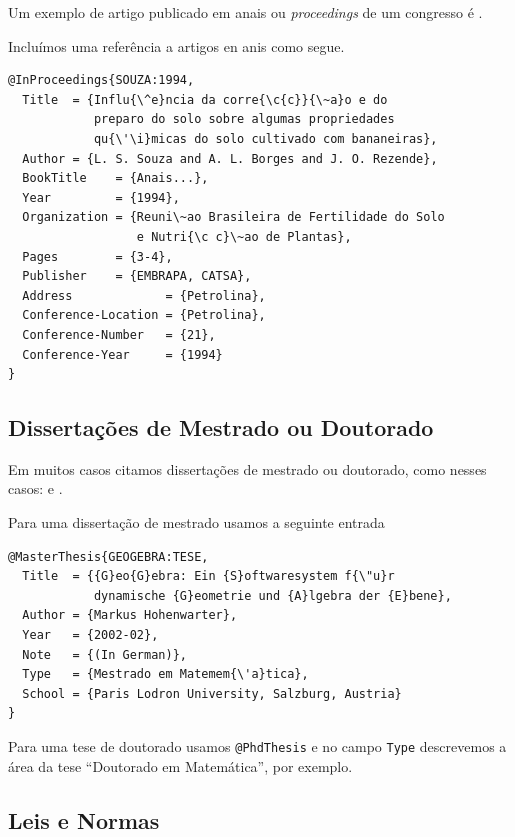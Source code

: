 \documentclass[fleqn]{icat-ufal}
\begin{document}
Um exemplo de artigo publicado em anais ou \textit{proceedings} 
de um congresso é \citeauthor{SOUZA:1994}.

Incluímos uma referência a artigos en anis como segue.
\begin{lstlisting}
@InProceedings{SOUZA:1994,
  Title  = {Influ{\^e}ncia da corre{\c{c}}{\~a}o e do
            preparo do solo sobre algumas propriedades
            qu{\'\i}micas do solo cultivado com bananeiras},
  Author = {L. S. Souza and A. L. Borges and J. O. Rezende},
  BookTitle    = {Anais...},
  Year         = {1994},
  Organization = {Reuni\~ao Brasileira de Fertilidade do Solo
                  e Nutri{\c c}\~ao de Plantas},
  Pages        = {3-4},
  Publisher    = {EMBRAPA, CATSA},
  Address             = {Petrolina},
  Conference-Location = {Petrolina},
  Conference-Number   = {21},
  Conference-Year     = {1994}
}
\end{lstlisting}

\subsection{Dissertações de Mestrado ou Doutorado}

Em muitos casos citamos dissertações de mestrado ou doutorado, como nesses casos:
\citeauthor{GEOGEBRA:TESE} e
\citeauthor{SOUZA:Bayesiana}.

Para uma dissertação de mestrado usamos a seguinte entrada
\begin{lstlisting}
@MasterThesis{GEOGEBRA:TESE,
  Title  = {{G}eo{G}ebra: Ein {S}oftwaresystem f{\"u}r 
            dynamische {G}eometrie und {A}lgebra der {E}bene},
  Author = {Markus Hohenwarter},
  Year   = {2002-02},
  Note   = {(In German)},
  Type   = {Mestrado em Matemem{\'a}tica},
  School = {Paris Lodron University, Salzburg, Austria}
}
\end{lstlisting}

Para uma tese de doutorado usamos \lstinline|@PhdThesis|
e no campo \lstinline|Type| descrevemos a área da tese 
``Doutorado em Matemática'', por exemplo.
    
\subsection{Leis e Normas}
\end{document}
